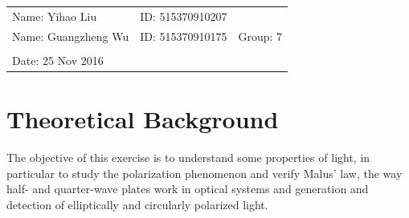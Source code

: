 \documentclass{article}
\begin{document}
\vspace*{0.25cm}

\hrulefill

\thispagestyle{empty}

\begin{center}
\begin{large}
\end{large}

\hrulefill

\vspace*{5cm}
\begin{Large}
\end{Large}

\vspace{2em}

\begin{large}
\end{large}
\end{center}


\vfill

\begin{table}[h!]
\flushleft
\begin{tabular}{lll}
Name: Yihao Liu \hspace*{2em}&
ID: 515370910207\hspace*{2em}\\
Name: Guangzheng Wu \hspace*{2em}&
ID: 515370910175\hspace*{2em}& Group: 7\\


\\

Date: 25 Nov 2016 

\end{tabular}
\end{table}

\hfill
\begin{tiny}
[rev. 1.0]
\end{tiny}

\newpage

\tableofcontents

\newpage

\section{Theoretical Background}
The objective of this exercise is to understand some properties of light, in particular to study the polarization phenomenon and verify Malus' law, the way half- and quarter-wave plates work in optical systems and generation and detection of elliptically and circularly polarized light.
\end{document}
